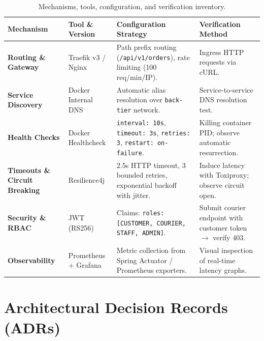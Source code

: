 \documentclass[11pt,a4paper]{article}
\begin{document}
\begin{table}[h]
\centering
\small
\begin{tabularx}{\textwidth}{p{3.2cm} p{2.8cm} X p{3.2cm}}
\toprule
\textbf{Mechanism} & \textbf{Tool \& Version} & \textbf{Configuration Strategy} & \textbf{Verification Method} \\
\midrule
\textbf{Routing \& Gateway} & Traefik v3 / Nginx & Path prefix routing (\texttt{/api/v1/orders}), rate limiting (100 req/min/IP). & Ingress HTTP requests via cURL. \\
\textbf{Service Discovery} & Docker Internal DNS & Automatic alias resolution over \texttt{back-tier} network. & Service-to-service DNS resolution test. \\
\textbf{Health Checks} & Docker Healthcheck & \texttt{interval: 10s}, \texttt{timeout: 3s}, \texttt{retries: 3}, \texttt{restart: on-failure}. & Killing container PID; observe automatic resurrection. \\
\textbf{Timeouts \& Circuit Breaking} & Resilience4j & 2.5s HTTP timeout, 3 bounded retries, exponential backoff with jitter. & Induce latency with Toxiproxy; observe circuit open. \\
\textbf{Security \& RBAC} & JWT (RS256) & Claims: \texttt{roles: [CUSTOMER, COURIER, STAFF, ADMIN]}. & Submit courier endpoint with customer token $\rightarrow$ verify 403. \\
\textbf{Observability} & Prometheus + Grafana & Metric collection from Spring Actuator / Prometheus exporters. & Visual inspection of real-time latency graphs. \\
\bottomrule
\end{tabularx}
\caption{Mechanisms, tools, configuration, and verification inventory.}
\end{table}

\newpage
\section{Architectural Decision Records (ADRs)}
\end{document}

